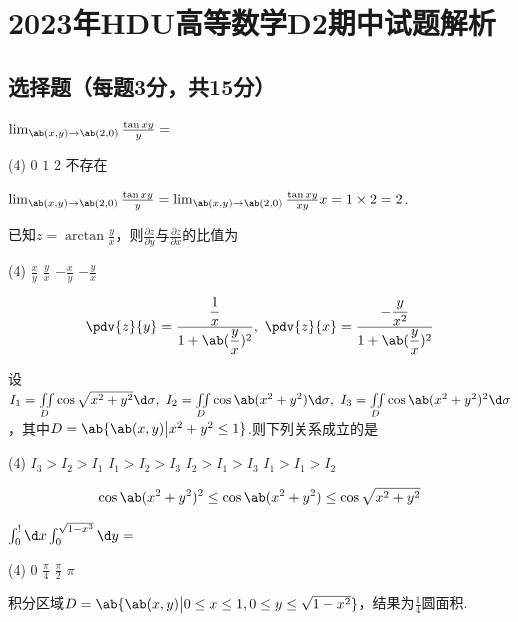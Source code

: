 \chapter{2023年HDU高等数学D2期中试题解析}
\section{选择题（每题3分，共15分）}
\begin{exercise}
    $\lim_{\ab(x,y)\to\ab(2,0)}\frac{\tan{xy}}{y}=$
    \begin{tasks}(4)
        \task $0$
        \task $1$
        \task $2$
        \task 不存在
    \end{tasks}
\end{exercise}
\begin{solution}
    $\lim_{\ab(x,y)\to\ab(2,0)}\frac{\tan{xy}}{y}=\lim_{\ab(x,y)\to\ab(2,0)}\frac{\tan{xy}}{xy}x=1\times 2=2$.
\end{solution}

\begin{exercise}
    已知$z=\arctan{\frac{y}{x}}$，则$\frac{\partial z}{\partial y}$与$\frac{\partial z}{\partial x}$的比值为
    \begin{tasks}(4)
        \task $\frac{x}{y}$
        \task $\frac{y}{x}$
        \task $-\frac{x}{y}$
        \task $-\frac{y}{x}$
    \end{tasks}
\end{exercise}
\begin{solution}
    $$\pdv{z}{y}=\frac{\dfrac{1}{x}}{1+\ab(\dfrac{y}{x})^2},\ \pdv{z}{x}=\frac{-\dfrac{y}{x^2}}{1+\ab(\dfrac{y}{x})^2}$$
\end{solution}

\begin{exercise}
    设$I_1=\iint\limits_D{\cos{\sqrt{x^2+y^2}}\d\sigma},\ I_2=\iint\limits_D{\cos{\ab(x^2+y^2)}\d\sigma},\ I_3=\iint\limits_D{\cos{\ab(x^2+y^2)^2}\d\sigma}$，其中$D=\ab{\ab(x,y)\big|x^2+y^2\le 1}$.则下列关系成立的是
    \begin{tasks}(4)
        \task $I_3>I_2>I_1$
        \task $I_1>I_2>I_3$
        \task $I_2>I_1>I_3$
        \task $I_1>I_1>I_2$
    \end{tasks}
\end{exercise}
\begin{solution}
    $$\cos{\ab(x^2+y^2)^2}\le\cos{\ab(x^2+y^2)}\le\cos{\sqrt{x^2+y^2}}$$
\end{solution}

\begin{exercise}
    $\int_0^!{\d x}\int_0^{\sqrt{1-x^3}}{\d y}=$
    \begin{tasks}(4)
        \task $0$
        \task $\frac{\pi}{4}$
        \task $\frac{\pi}{2}$
        \task $\pi$
    \end{tasks}
\end{exercise}
\begin{solution}
    积分区域$D=\ab{\ab(x,y)\big|0\le x\le 1,0\le y\le\sqrt{1-x^2}}$，结果为$\frac{1}{4}$圆面积.
\end{solution}

